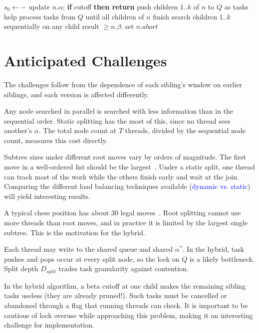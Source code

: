 \documentclass[10pt, conference, compsocconf]{IEEEtran}
\newcommand{\rev}[1]{\textcolor{blue}{#1}}
\begin{document}
\begin{algorithm}[H]
\caption{Hybrid split at node $n$ (sketch)}
\label{alg:hyb}
\begin{algorithmic}[1]
\State $s_0 \gets -$ 
\State update $n.\alpha$; \textbf{if} cutoff \textbf{then return}
  \State push children $1..k$ of $n$ to $Q$ as tasks
  \State help process tasks from $Q$ until all children of $n$ finish
\Else
  \State search children $1..k$ sequentially
\EndIf
\State on any child result $\geq n.\beta$: set $n.abort$
\end{algorithmic}
\end{algorithm}

\section{Anticipated Challenges}

The challenges follow from the dependence of each sibling's window on earlier siblings, and each version is affected differently.

Any node searched in parallel is searched with less information than in the sequential order. Static splitting has the most of this, since no thread sees another's $\alpha$. The total node count at $T$ threads, divided by the sequential node count, measures this cost directly.

Subtree sizes under different root moves vary by orders of magnitude. The first move in a well-ordered list should be the largest~\cite{knuth1975}. Under a static split, one thread can track most of the work while the others finish early and wait at the join. Comparing the different load balancing techniques available (\rev{dynamic vs. static}) will yield interesting results.

A typical chess position has about 30 legal moves~\cite{shannon1950}. Root splitting cannot use more threads than root moves, and in practice it is limited by the largest single subtree. This is the motivation for the hybrid.

Each thread may write to the shared queue and shared $\alpha^{*}$. In the hybrid, task pushes and pops occur at every split node, so the lock on $Q$ is a likely bottleneck. Split depth $D_{split}$ trades task granularity against contention.

In the hybrid algorithm, a beta cutoff at one child makes the remaining sibling tasks useless (they are already pruned!). Such tasks must be cancelled or abandoned through a flag that running threads can check. It is important to be cautious of lock overuse while approaching this problem, making it an interesting challenge for implementation.
\end{document}
